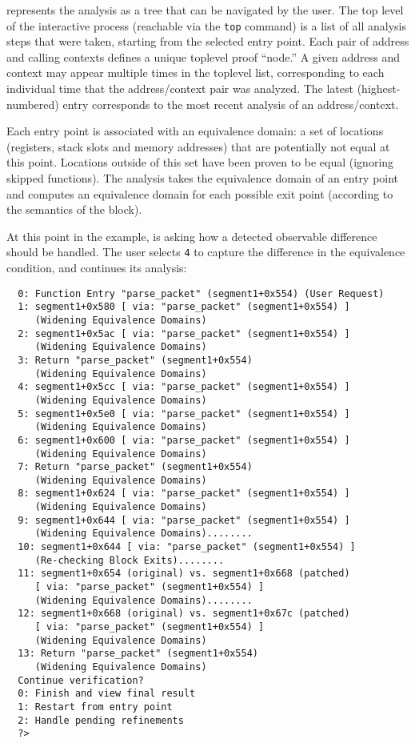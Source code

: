\pate{} represents the analysis as a tree that can be navigated by the user.
The top level of the interactive process (reachable via the \texttt{top} command) is a list of all analysis steps that were taken, starting from the selected entry point.
Each pair of address and calling contexts defines a unique toplevel proof ``node.''
A given address and context may appear multiple times in the toplevel list, corresponding to each individual time that the address/context pair was analyzed.
The latest (highest-numbered) entry corresponds to the most recent analysis of an address/context.

Each entry point is associated with an equivalence domain: a set of locations (registers, stack slots and memory addresses) that are potentially not equal at this point.
Locations outside of this set have been proven to be equal (ignoring skipped functions).
The analysis takes the equivalence domain of an entry point and computes an equivalence domain for each possible exit point (according to the semantics of the block).

At this point in the example, \pate{} is asking how a detected observable difference should be handled.
The user selects \texttt{4} to capture the difference in the equivalence condition, and \pate{} continues its analysis:

\begin{verbatim}
  0: Function Entry "parse_packet" (segment1+0x554) (User Request)
  1: segment1+0x580 [ via: "parse_packet" (segment1+0x554) ]
     (Widening Equivalence Domains)
  2: segment1+0x5ac [ via: "parse_packet" (segment1+0x554) ]
     (Widening Equivalence Domains)
  3: Return "parse_packet" (segment1+0x554)
     (Widening Equivalence Domains)
  4: segment1+0x5cc [ via: "parse_packet" (segment1+0x554) ]
     (Widening Equivalence Domains)
  5: segment1+0x5e0 [ via: "parse_packet" (segment1+0x554) ]
     (Widening Equivalence Domains)
  6: segment1+0x600 [ via: "parse_packet" (segment1+0x554) ]
     (Widening Equivalence Domains)
  7: Return "parse_packet" (segment1+0x554)
     (Widening Equivalence Domains)
  8: segment1+0x624 [ via: "parse_packet" (segment1+0x554) ]
     (Widening Equivalence Domains)
  9: segment1+0x644 [ via: "parse_packet" (segment1+0x554) ]
     (Widening Equivalence Domains)........
  10: segment1+0x644 [ via: "parse_packet" (segment1+0x554) ]
     (Re-checking Block Exits)........
  11: segment1+0x654 (original) vs. segment1+0x668 (patched)
     [ via: "parse_packet" (segment1+0x554) ]
     (Widening Equivalence Domains)........
  12: segment1+0x668 (original) vs. segment1+0x67c (patched)
     [ via: "parse_packet" (segment1+0x554) ]
     (Widening Equivalence Domains)
  13: Return "parse_packet" (segment1+0x554)
     (Widening Equivalence Domains)
  Continue verification?
  0: Finish and view final result
  1: Restart from entry point
  2: Handle pending refinements
  ?>
\end{verbatim}

